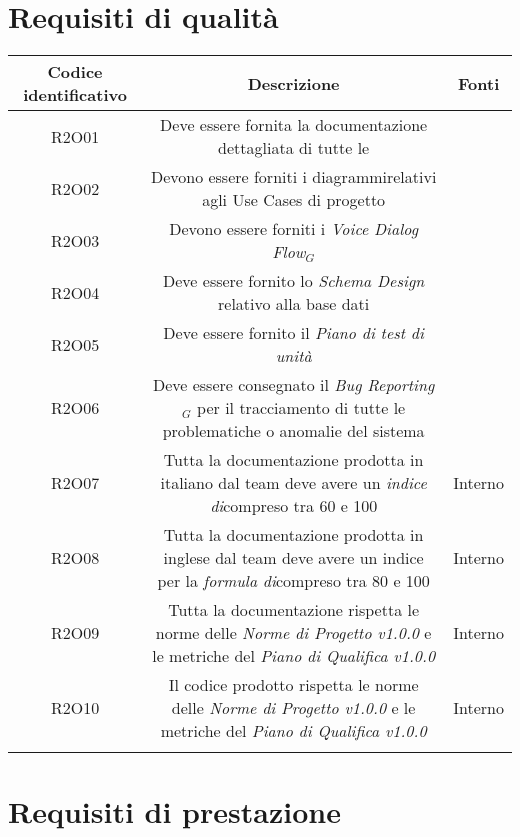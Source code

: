 \section{Requisiti di qualità}
\begin{tabularx}{\textwidth}{|C|C|C|}
	\hline
	\textbf{Codice identificativo} & \textbf{Descrizione} & \textbf{Fonti} \\
	\hline
	\endhead
	R2O01 & Deve essere fornita la documentazione dettagliata di tutte le  & \\
	\hline
	R2O02 & Devono essere forniti i diagrammirelativi agli Use Cases di progetto  & \\
	\hline
	R2O03 & Devono essere forniti i \textit{Voice Dialog Flow$_{G}$} & \\
	\hline
	R2O04 & Deve essere fornito lo \textit{Schema Design} relativo alla base dati  & \\
	\hline
	R2O05 & Deve essere fornito il \textit{Piano di test di unità} & \\
	\hline
	R2O06 & Deve essere consegnato il \textit{Bug Reporting$_{G}$} per il tracciamento di
	tutte le problematiche o anomalie del sistema & \\
	\hline
	R2O07 & Tutta la documentazione prodotta in italiano dal team deve avere
	un \textit{indice di}compreso tra 60 e 100 & Interno\\
	\hline
	R2O08 & Tutta la documentazione prodotta in inglese dal team deve avere
	un indice per la \textit{formula di}compreso tra 80 e 100 & Interno\\
	\hline
	R2O09 & Tutta la documentazione rispetta le norme delle \textit{Norme di Progetto v1.0.0} e le metriche del \textit{Piano di Qualifica v1.0.0}& Interno\\
	\hline
	R2O10 & Il codice prodotto rispetta le norme delle \textit{Norme di Progetto v1.0.0} e le metriche del \textit{Piano di Qualifica v1.0.0}& Interno\\
	\hline
    \caption{Tabella requisiti di qualità}
\end{tabularx}

\section{Requisiti di prestazione}

